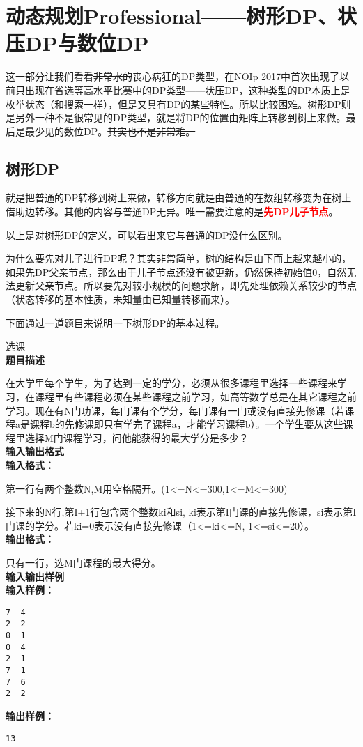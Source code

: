 \section{动态规划Professional------树形DP、状压DP与数位DP}
这一部分让我们看看\sout{非常水的}丧心病狂的DP类型，在NOIp 2017中首次出现了以前只出现在省选等高水平比赛中的DP类型------状压DP，这种类型的DP本质上是枚举状态（和搜索一样），但是又具有DP的某些特性。所以比较困难。树形DP则是另外一种不是很常见的DP类型，就是将DP的位置由矩阵上转移到树上来做。最后是最少见的数位DP。\sout{其实也不是非常难。}
\subsection{树形DP}
\begin{definition}[树形DP]就是把普通的DP转移到树上来做，转移方向就是由普通的在数组转移变为在树上借助边转移。其他的内容与普通DP无异。唯一需要注意的是\textcolor{red}{\textbf{先DP儿子节点}}。
\end{definition}

以上是对树形DP的定义，可以看出来它与普通的DP没什么区别。

为什么要先对儿子进行DP呢？其实非常简单，树的结构是由下而上越来越小的，如果先DP父亲节点，那么由于儿子节点还没有被更新，仍然保持初始值0，自然无法更新父亲节点。所以要先对较小规模的问题求解，即先处理依赖关系较少的节点（状态转移的基本性质，未知量由已知量转移而来）。

下面通过一道题目来说明一下树形DP的基本过程。
\begin{example}选课\\
	\textbf{题目描述}

	在大学里每个学生，为了达到一定的学分，必须从很多课程里选择一些课程来学习，在课程里有些课程必须在某些课程之前学习，如高等数学总是在其它课程之前学习。现在有N门功课，每门课有个学分，每门课有一门或没有直接先修课（若课程a是课程b的先修课即只有学完了课程a，才能学习课程b）。一个学生要从这些课程里选择M门课程学习，问他能获得的最大学分是多少？
	\ \\
	\textbf{输入输出格式}
	\ \\
	\textbf{输入格式：}

	第一行有两个整数N,M用空格隔开。(1<=N<=300,1<=M<=300)

	接下来的N行,第I+1行包含两个整数ki和si, ki表示第I门课的直接先修课，si表示第I门课的学分。若ki=0表示没有直接先修课（1<=ki<=N, 1<=si<=20）。
	\\
	\textbf{输出格式：}

	只有一行，选M门课程的最大得分。
	\\
	\textbf{输入输出样例}
	\\
	\textbf{输入样例：}
	\begin{verbatim}
7  4
2  2
0  1
0  4
2  1
7  1
7  6
2  2
\end{verbatim}
	\textbf{输出样例：}
	\begin{verbatim}
13
\end{verbatim}
\end{example}

